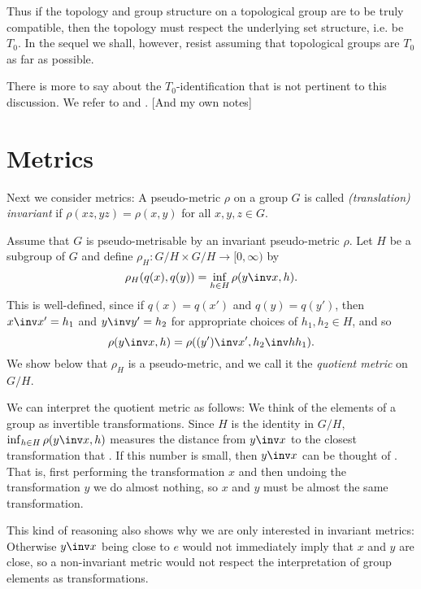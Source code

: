 \documentclass[article, a4paper, 11pt, oneside]{memoir}
\numberwithin{equation}{chapter}
\begin{document}
Thus if the topology and group structure on a topological group are to be truly compatible, then the topology must respect the underlying set structure, i.e. be $T_0$. In the sequel we shall, however, resist assuming that topological groups are $T_0$ as far as possible.

There is more to say about the $T_0$-identification that is not pertinent to this discussion. We refer to \textcite[Exercise~13C]{willard} and \textcite{pirttimäki2019}. [And my own notes]


\section{Metrics}

Next we consider metrics: A pseudo-metric $\rho$ on a group $G$ is called \emph{(translation) invariant} if $\rho(xz,yz) = \rho(x,y)$ for all $x,y,z \in G$.

Assume that $G$ is pseudo-metrisable by an invariant pseudo-metric $\rho$. Let $H$ be a subgroup of $G$ and define $\rho_H \colon G/H \times G/H \to [0,\infty)$ by
%
\begin{equation*}
    \rho_H(q(x), q(y))
        = \inf_{h \in H} \rho(y\inv x, h).
\end{equation*}
%
This is well-defined, since if $q(x) = q(x')$ and $q(y) = q(y')$, then $x\inv x' = h_1$ and $y\inv y' = h_2$ for appropriate choices of $h_1,h_2 \in H$, and so
%
\begin{equation*}
    \rho(y\inv x, h)
        = \rho((y')\inv x', h_2\inv h h_1).
\end{equation*}
%
We show below that $\rho_H$ is a pseudo-metric, and we call it the \emph{quotient metric} on $G/H$.

We can interpret the quotient metric as follows: We think of the elements of a group as invertible transformations. Since $H$ is the identity in $G/H$, $\inf_{h \in H} \rho(y\inv x, h)$ measures the distance from $y\inv x$ to the closest transformation that . If this number is small, then $y\inv x$ can be thought of . That is, first performing the transformation $x$ and then undoing the transformation $y$ we do almost nothing, so $x$ and $y$ must be almost the same transformation.

This kind of reasoning also shows why we are only interested in invariant metrics: Otherwise $y\inv x$ being close to $e$ would not immediately imply that $x$ and $y$ are close, so a non-invariant metric would not respect the interpretation of group elements as transformations.
\end{document}
